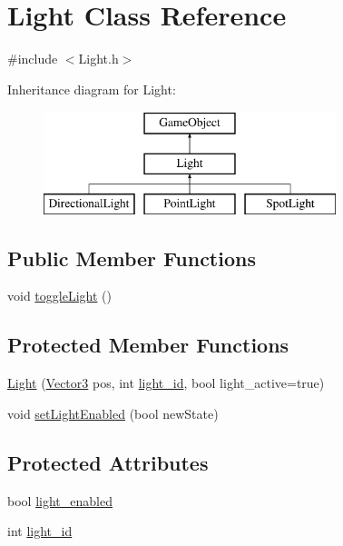 \hypertarget{class_light}{}\section{Light Class Reference}
\label{class_light}


{\ttfamily \#include $<$Light.\+h$>$}

Inheritance diagram for Light\+:\begin{figure}[H]
\begin{center}
\leavevmode
\includegraphics[height=3.000000cm]{class_light}
\end{center}
\end{figure}
\subsection*{Public Member Functions}
\begin{DoxyCompactItemize}
\item 
void \hyperlink{class_light_ae0b3607b306357b4b4540e8759ef3fbf}{toggle\+Light} ()
\end{DoxyCompactItemize}
\subsection*{Protected Member Functions}
\begin{DoxyCompactItemize}
\item 
\hyperlink{class_light_a87c35098e794c0b8c929308145e0786e}{Light} (\hyperlink{class_vector3}{Vector3} pos, int \hyperlink{class_light_ae0028340ad3a9f2e196b68365d5fe972}{light\+\_\+id}, bool light\+\_\+active=true)
\item 
void \hyperlink{class_light_a0fbb865c0d4810c4521ecc92dfd69a0f}{set\+Light\+Enabled} (bool new\+State)
\end{DoxyCompactItemize}
\subsection*{Protected Attributes}
\begin{DoxyCompactItemize}
\item 
bool \hyperlink{class_light_ab622899f496ea310685e6cbb45977cac}{light\+\_\+enabled}
\item 
int \hyperlink{class_light_ae0028340ad3a9f2e196b68365d5fe972}{light\+\_\+id}
\end{DoxyCompactItemize}
